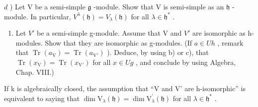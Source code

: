 \(d\) ) Let V be a semi-simple \(\mathfrak{g}\) -module. Show that V is semi-simple as an \(\mathfrak{h}\) -module. In particular, \(V^{\lambda}(\mathfrak{h}) = V_{\lambda}(\mathfrak{h})\) for all \(\lambda \in \mathfrak{h}^{*}\) .

\begin{enumerate}
\def\labelenumi{\alph{enumi})}
\setcounter{enumi}{4}
\tightlist
\item
  Let \(V'\) be a semi-simple g-module. Assume that V and \(V'\) are isomorphic as h-modules. Show that they are isomorphic as g-modules. (If \(a \in Uh\) , remark that \(\operatorname{Tr}(a_{\mathrm{V}}) = \operatorname{Tr}(a_{\mathrm{V}'})\) ). Deduce, by using b) or c), that \(\operatorname{Tr}(x_{\mathrm{V}}) = \operatorname{Tr}(x_{\mathrm{V}'})\) for all \(x \in Ug\) , and conclude by using Algebra, Chap. VIII.)
\end{enumerate}

If k is algebraically closed, the assumption that ``V and V' are h-isomorphic'' is equivalent to saying that \(\dim\mathrm{V}_{\lambda}(\mathfrak{h})=\dim\mathrm{V}_{\lambda}^{\prime}(\mathfrak{h})\) for all \(\lambda\in\mathfrak{h}^{*}\) .


